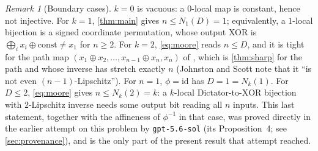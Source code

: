\documentclass[11pt,a4paper]{article}
\theoremstyle{plain}
\theoremstyle{definition}
\theoremstyle{remark}
\newtheorem{remark}[theorem]{Remark}
\newcommand{\Dict}{\mathrm{Dictator}}
\newcommand{\XOR}{\mathrm{XOR}}
\begin{document}
\begin{remark}[Boundary cases]
$k=0$ is vacuous: a $0$-local map is constant, hence not injective. For $k=1$, \cref{thm:main} gives $n\le N_1(D)=1$; equivalently, a $1$-local bijection is a signed coordinate permutation, whose output XOR is $\bigoplus_i x_i\oplus\text{const}\ne x_1$ for $n\ge2$. For $k=2$, \eqref{eq:moore} reads $n\le D$, and it is tight for the path map $(x_1\oplus x_2,\dots,x_{n-1}\oplus x_n,x_n)$ of \cite{RS18}, which is \cref{thm:sharp} for the path and whose inverse has stretch exactly $n$ (Johnston and Scott note that it ``is not even $(n-1)$-Lipschitz''). For $n=1$, $\phi=\mathrm{id}$ has $D=1=N_k(1)$. For $D\le2$, \eqref{eq:moore} gives $n\le N_k(2)=k$: a $k$-local $\Dict$-to-$\XOR$ bijection with $2$-Lipschitz inverse needs some output bit reading all $n$ inputs. This last statement, together with the affineness of $\phi^{-1}$ in that case, was proved directly in the earlier attempt on this problem by \texttt{gpt-5.6-sol} (its Proposition~4; see \cref{sec:provenance}), and is the only part of the present result that attempt reached.
\end{remark}
\end{document}

